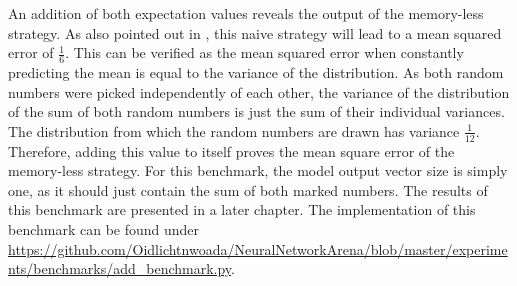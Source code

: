 \documentclass[draft,final]{vutinfth} %
\begin{document}
    An addition of both expectation values reveals the output of the memory-less strategy.
    As also pointed out in \cite[p. 6]{UnitaryRNNs}, this naive strategy will lead to a mean squared error of $\frac{1}{6}$.
    This can be verified as the mean squared error when constantly predicting the mean is equal to the variance of the distribution.
    As both random numbers were picked independently of each other, the variance of the distribution of the sum of both random numbers is just the sum of their individual variances.
    The distribution from which the random numbers are drawn has variance $\frac{1}{12}$.
    Therefore, adding this value to itself proves the mean square error of the memory-less strategy.
    For this benchmark, the model output vector size is simply one, as it should just contain the sum of both marked numbers.
    The results of this benchmark are presented in a later chapter.
    The implementation of this benchmark can be found under \url{https://github.com/Oidlichtnwoada/NeuralNetworkArena/blob/master/experiments/benchmarks/add_benchmark.py}.
\end{document}
